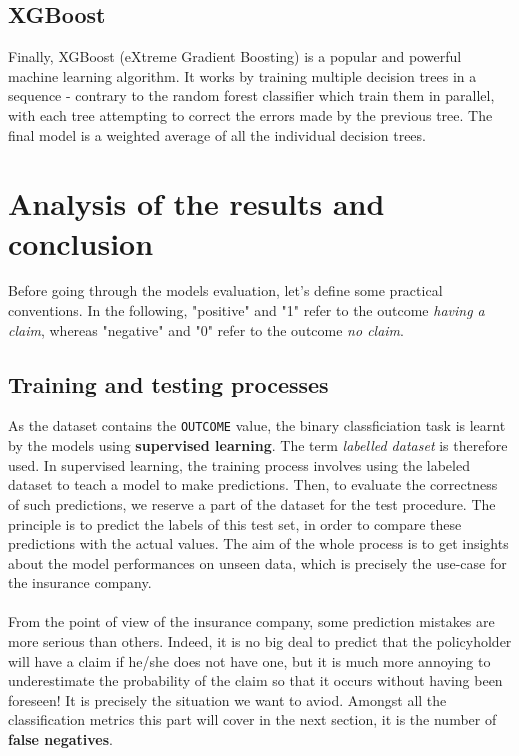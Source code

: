 \documentclass[a4paper,11pt, titlepage]{article}
\begin{document}
\subsection{XGBoost}

Finally, XGBoost (eXtreme Gradient Boosting) is a popular and powerful machine learning algorithm. It works by training multiple decision trees in a sequence - contrary to the random forest classifier which train them in parallel, with each tree attempting to correct the errors made by the previous tree. The final model is a weighted average of all the individual decision trees.



\section{Analysis of the results and conclusion} \label{results}

Before going through the models evaluation, let's define some practical conventions. In the following, "positive" and "1" refer to the outcome \textsl{having a claim}, whereas "negative" and "0" refer to the outcome \textsl{no claim}. 

\subsection{Training and testing processes}

As the dataset contains the {\tt OUTCOME} value, the binary classficiation task is learnt by the models using \textbf{supervised learning}. The term \textsl{labelled dataset} is therefore used. In supervised learning, the training process involves using the labeled dataset to teach a model to make predictions. Then, to evaluate the correctness of such predictions, we reserve a part of the dataset for the test procedure. The principle is to predict the labels of this test set, in order to compare these predictions with the actual values. The aim of the whole process is to get insights about the model performances on unseen data, which is precisely the use-case for the insurance company.\\
\\
\noindent From the point of view of the insurance company, some prediction mistakes are more serious than others. Indeed, it is no big deal to predict that the policyholder will have a claim if he/she does not have one, but it is much more annoying to underestimate the probability of the claim so that it occurs without having been foreseen! It is precisely the situation we want to aviod. Amongst all the classification metrics this part will cover in the next section, it is the number of \textbf{false negatives}.
\end{document}

